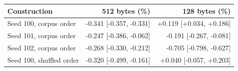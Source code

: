 \begin{tabular}{lrr}
\toprule
Construction & 512 bytes (\%) & 128 bytes (\%) \\
\midrule
Seed 100, corpus order & -0.341 [-0.357, -0.331] & +0.119 [+0.034, +0.186] \\
Seed 101, corpus order & -0.247 [-0.386, -0.062] & -0.191 [-0.267, -0.081] \\
Seed 102, corpus order & -0.268 [-0.330, -0.212] & -0.705 [-0.798, -0.627] \\
Seed 100, shuffled order & -0.320 [-0.499, -0.161] & +0.040 [-0.057, +0.203] \\
\bottomrule
\end{tabular}
